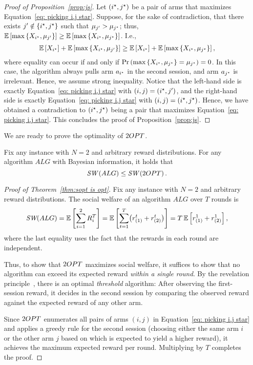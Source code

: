 \begin{proof}[Proof of Proposition~\ref{prop:js}]
Let $({i^\star}, {j^\star})$ be a pair of arms that maximizes Equation~\eqref{eq: picking i,j star}.
Suppose, for the sake of contradiction, that there exists ${j'}\notin \{{i^\star},{j^\star}\}$ such that $\mu_{j'} > \mu_{{j^\star}}$;
thus, $\mathbb{E}\left[ \max{\{X_{{i^\star}}, \mu_{{j'}}\}} \right] \geq \mathbb{E}\left[ \max{\{X_{{i^\star}}, \mu_{{j^\star}}\}} \right]$.
I.e.,
\begin{align*}
    \mathbb{E}\left[ X_{{i^\star}} \right] + \mathbb{E}\left[ \max{\{X_{{i^\star}}, \mu_{{j'}}\}} \right] \geq \mathbb{E}\left[ X_{{i^\star}} \right] + \mathbb{E}\left[ \max{\{X_{{i^\star}}, \mu_{{j^\star}}\}} \right],
\end{align*}
where equality can occur if and only if $\Pr\left( \max{\{X_{{i^\star}}, \mu_{{j^\star}}\}} = \mu_{{j^\star}} \right) = 0$.
In this case, the algorithm always pulls arm $a_{{i^\star}}$ in the second session, and arm $a_{{j^\star}}$ is irrelevant.
Hence, we assume strong inequality.
Notice that the left-hand side is exactly Equation~\eqref{eq: picking i,j star} with $(i,j) = ({i^\star}, {j'})$, and the right-hand side is exactly Equation~\eqref{eq: picking i,j star} with $(i,j) = ({i^\star}, {j^\star})$.
Hence, we have obtained a contradiction to $({i^\star}, {j^\star})$ being a pair that maximizes Equation~\eqref{eq: picking i,j star}. This concludes the proof of Proposition~\ref{prop:js}.
\end{proof}
We are ready to prove the optimality of $2OPT$.
\begin{theorem}\label{thm:sopt is opt}
Fix any instance with $N=2$ and arbitrary reward distributions. For any algorithm $ALG$ with Bayesian information, it holds that
\[\textit{SW}\left(ALG\right) \leq \textit{SW}\left(2OPT\right).\]    
\end{theorem}
\begin{proof}[Proof of Theorem~\ref{thm:sopt is opt}]
Fix any instance with $N=2$ and arbitrary reward distributions. The social welfare of an algorithm $ALG$ over $T$ rounds is
\[
\textit{SW}(ALG) 
=\mathbb{E}\left[  \sum^2_{i=1}{R_i^T} \right]= \mathbb{E}\left[ \sum_{t=1}^T \bigl(r^t_{(1)} + r^t_{(2)}\bigr) \right]
= T \, \mathbb{E}\left[ r^1_{(1)} + r^1_{(2)} \right],
\]
where the last equality uses the fact that the rewards in each round are independent.

Thus, to show that $2OPT$ maximizes social welfare, it suffices to show that no algorithm can exceed its expected reward \emph{within a single round}. By the revelation principle~\cite{peters2001common}, there is an optimal \emph{threshold} algorithm: After observing the first-session reward, it decides in the second session by comparing the observed reward against the expected reward of any other arm.

Since $2OPT$ enumerates all pairs of arms $(i,j)$ in Equation~\eqref{eq: picking i,j star} and applies a greedy rule for the second session (choosing either the same arm $i$ or the other arm $j$ based on which is expected to yield a higher reward), it achieves the maximum expected reward per round. Multiplying by $T$ completes the proof.
\end{proof}

